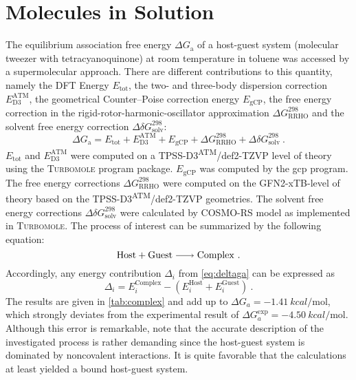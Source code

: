 \documentclass[a4paper,12pt]{scrartcl}
\begin{document}
\section{Molecules in Solution}
%
The equilibrium association free energy $ \Delta G_\mathrm{a} $ of a host-guest system (molecular tweezer with tetracyanoquinone) at room temperature in toluene was accessed by a supermolecular approach. There are different contributions to this quantity, namely the DFT Energy $ E_\mathrm{tot} $, the two- and three-body dispersion correction $ E_\mathrm{D3}^\mathrm{ATM} $, the geometrical Counter--Poise correction energy $ E_\mathrm{gCP} $, the free energy correction in the rigid-rotor-harmonic-oscillator approximation $ \Delta G_\mathrm{RRHO}^{298} $ and the solvent free energy correction $ \Delta \delta G_\mathrm{solv}^{298} $:
%
\begin{equation}
	\label{eq:deltaga}
	\Delta G_\mathrm{a} =  E_\mathrm{tot} + E_\mathrm{D3}^\mathrm{ATM} + E_\mathrm{gCP} + \Delta G_\mathrm{RRHO}^{298} +  \Delta \delta G_\mathrm{solv}^{298}~.
\end{equation}
%
$ E_\mathrm{tot} $ and $ E_\mathrm{D3}^\mathrm{ATM} $ were computed on a TPSS\autocite[]{tpss}-D3\textsuperscript{ATM}\autocite[]{dftd3,dftd3-bj}/def2-TZVP\autocite[]{def2-tzvp} level of theory using the \textsc{Turbomole} program package. $ E_\mathrm{gCP} $ was computed by the gcp\autocite[]{gcp} program. The free energy corrections $ \Delta G_\mathrm{RRHO}^{298} $ were computed on the GFN2-xTB\autocite[]{gfn2-xtb}-level of theory based on the TPSS-D3\textsuperscript{ATM}/def2-TZVP geometries. The solvent free energy corrections $ \Delta \delta G_\mathrm{solv}^{298} $ were calculated by COSMO-RS model as implemented in \textsc{Turbomole}\autocite[]{cosmotherm}. The process of interest can be summarized by the following equation:
%
\begin{equation}
	\ce{Host + Guest -> Complex}~.
\end{equation}
%
Accordingly, any energy contribution $ \Delta_i $  from \autoref{eq:deltaga} can be expressed as
%
\begin{equation}
	\Delta_i = E^\mathrm{Complex}_i - (E^\mathrm{Host}_i + E^\mathrm{Guest}_i)~.
\end{equation}
%
The results are given in \autoref{tab:complex} and add up to $ \Delta G_a = \SI[]{-1.41}{kcal\per\mole} $, which strongly deviates from the experimental result of $ \Delta G_a^\mathrm{exp} = \SI[]{-4.50}{kcal\per\mole} $. Although this error is remarkable, note that the accurate description of the investigated process is rather demanding since the host-guest system is dominated by noncovalent interactions. It is quite favorable that the calculations at least yielded a bound host-guest system.
\end{document}
